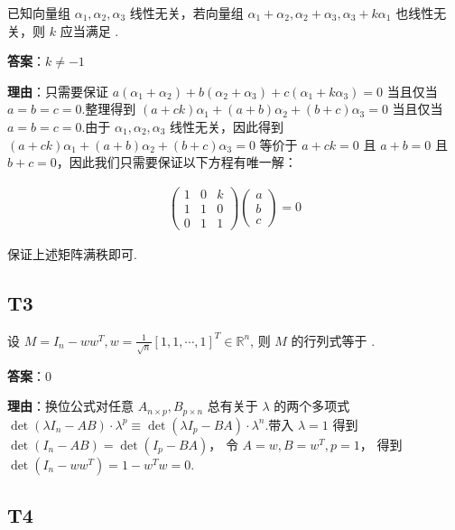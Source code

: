 \documentclass{article}
\begin{document}
\par 已知向量组 $\alpha_1, \alpha_2, \alpha_3$ 线性无关，若向量组 $\alpha_1+\alpha_2, \alpha_2+\alpha_3, \alpha_3+k\alpha_1$ 也线性无关，则 $k$ 应当满足 \underline{\phantom{empty\_space}}.

\par \textbf{答案}：$k\neq -1$

\par \textbf{理由}：只需要保证 $a(\alpha_1+\alpha_2) + b(\alpha_2+\alpha_3)+c(\alpha_1+k\alpha_3)=0$ 当且仅当 $a=b=c=0$.整理得到 $(a+ck)\alpha_1 + (a+b)\alpha_2 + (b+c)\alpha_3=0$ 当且仅当 $a=b=c=0$.由于 $\alpha_1, \alpha_2, \alpha_3$ 线性无关，因此得到 $(a+ck)\alpha_1 + (a+b)\alpha_2 + (b+c)\alpha_3=0$ 等价于 $a+ck=0$ 且 $a+b=0$ 且 $b+c=0$，因此我们只需要保证以下方程有唯一解：

\begin{align*}
	\begin{pmatrix}
		1 & 0 & k\\
		1 & 1 & 0\\
		0 & 1 & 1
	\end{pmatrix} \begin{pmatrix}
		a\\b\\c
	\end{pmatrix}=0
\end{align*}

保证上述矩阵满秩即可.

\subsection{T3}

\par 设 $M=I_n - ww^T, w=\frac{1}{\sqrt n}[ 1, 1, \cdots, 1]^T \in \mathbb R^n$, 则 $M$ 的行列式等于 \underline{\phantom{empty\_space}}.

\par \textbf{答案}：0

\par \textbf{理由}：换位公式对任意 $A_{n\times p}, B_{p\times n}$ 总有关于 $\lambda$ 的两个多项式 $\det(\lambda I_n - AB) \cdot \lambda^p \equiv \det(\lambda I_p - BA) \cdot \lambda^n $.带入 $\lambda = 1$ 得到 $\det(I_n - AB) = \det(I_p - BA)$， 令 $A=w, B=w^T, p=1$， 得到 $\det(I_n - ww^T)=1 - w^Tw=0$.

\subsection{T4}
\end{document}
